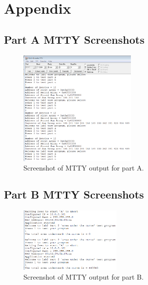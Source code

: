 \documentclass[10pt, letterpaper, titlepage]{article} %
\begin{document}
\newpage

\section{Appendix}
\subsection{Part A MTTY Screenshots}
\begin{figure}[H]
   \includegraphics[width=0.52\textwidth]{mttypartA.png}
   \centering  
   \caption{Screenshot of MTTY output for part A.} 
   \label{figure:4}
\end{figure}

\subsection{Part B MTTY Screenshots}
\begin{figure}[H]
   \includegraphics[width=0.45\textwidth]{mttypartB.png}
   \centering  
   \caption{Screenshot of MTTY output for part B.} 
   \label{figure:5}
\end{figure}
\end{document}
